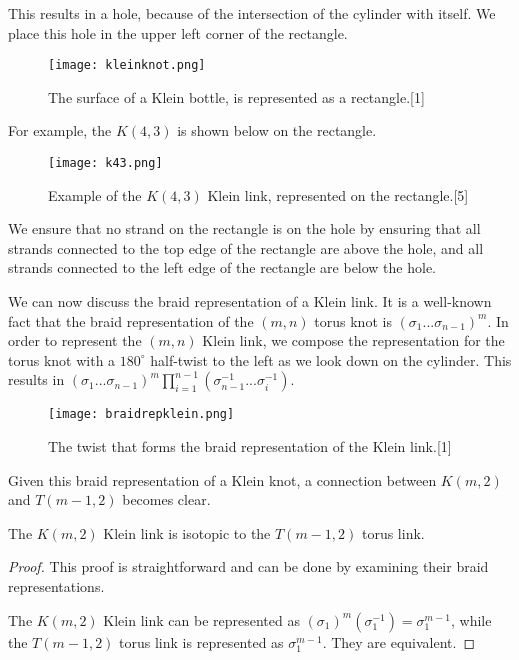 \documentclass[12pt]{article}
\newenvironment{theorem}[2][Theorem]{\begin{trivlist}
\item[\hskip \labelsep {\bfseries #1}\hskip \labelsep {\bfseries #2.}]}{\end{trivlist}}
\begin{document}
This results in a hole, because of the intersection of the cylinder with itself. We place this hole in the upper left corner of the rectangle. 

\begin{figure}[H]
\centering
\texttt{[image: kleinknot.png]}
\caption{\label{Klein rectangle} The surface of a Klein bottle, is represented as a rectangle.[1]}
\end{figure}

For example, the $K(4, 3)$ is shown below on the rectangle. 

\begin{figure}[H]
\centering
\texttt{[image: k43.png]}
\caption{\label{K(4, 3)} Example of the $K(4, 3)$ Klein link, represented on the rectangle.[5]}
\end{figure}

We ensure that no strand on the rectangle is on the hole by ensuring that all strands connected to the top edge of the rectangle are above the hole, and all strands connected to the left edge of the rectangle are below the hole. 




We can now discuss the braid representation of a Klein link. It is a well-known fact that the braid representation of the $(m, n)$ torus knot is $(\sigma _1 ...\sigma _{n-1})^m$. In order to represent the $(m,n)$ Klein link, we compose the representation for the torus knot with a $180^{\circ}$ half-twist to the left as we look down on the cylinder. This results in $(\sigma _1 ...\sigma _{n-1})^m\prod_{i=1} ^{n-1} (\sigma_{n-1}^{-1}...\sigma_{i}^{-1})$.

\begin{figure}[H]
\centering
\texttt{[image: braidrepklein.png]}
\caption{\label{Braid rep klein knot} The twist that forms the braid representation of the Klein link.[1]}
\end{figure}

Given this braid representation of a Klein knot, a connection between $K(m, 2)$ and $T(m-1, 2)$ becomes clear.  

\begin{theorem}{1.1} [1]
The $K(m, 2)$ Klein link is isotopic to the $T(m-1, 2)$ torus link. 
\end{theorem}

\begin{proof}
This proof is straightforward and can be done by examining their braid representations. 

The $K(m, 2)$ Klein link can be represented as $(\sigma_1)^m (\sigma_1^{-1}) = \sigma_1^{m-1}$, while the $T(m-1, 2)$ torus link is represented as $\sigma_1^{m-1}$. They are equivalent. 
\end{proof}
\end{document}
